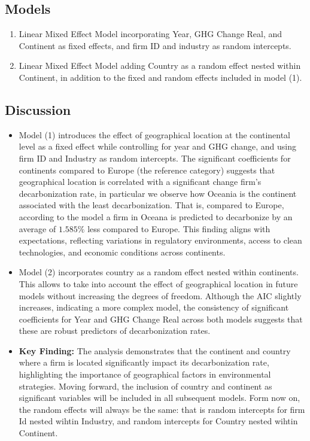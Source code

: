 \subsection{Models} 
\begin{enumerate}
    \item Linear Mixed Effect Model incorporating Year, GHG Change Real, and Continent as fixed effects, and firm ID and industry as random intercepts.
    \item Linear Mixed Effect Model adding Country as a random effect nested within Continent, in addition to the fixed and random effects included in model (1).
\end{enumerate}



\subsection{Discussion}
\begin{itemize}
    \item Model (1) introduces the effect of geographical location at the continental level as a fixed effect while controlling for year and GHG change, and using firm ID and Industry as random intercepts. The significant coefficients for continents compared to Europe (the reference category) suggests that geographical location is correlated with a significant change firm's decarbonization rate, in particular we observe how Oceania is the continent associated with the least decarbonization. That is, compared to Europe, according to the model a firm in Oceana is predicted to decarbonize by an average of $1.585 \%$ less compared to Europe. This finding aligns with expectations, reflecting variations in regulatory environments, access to clean technologies, and economic conditions across continents.
    \item Model (2) incorporates country as a random effect nested within continents. This allows to take into account the effect of geographical location in future models without increasing the degrees of freedom. Although the AIC slightly increases, indicating a more complex model, the consistency of significant coefficients for Year and GHG Change Real across both models suggests that these are robust predictors of decarbonization rates.
    \item \textbf{Key Finding:} The analysis demonstrates that the continent and country where a firm is located significantly impact its decarbonization rate, highlighting the importance of geographical factors in environmental strategies. Moving forward, the inclusion of country and continent as significant variables will be included in all subsequent models. Form now on, the random effects will always be the same: that is random intercepts for firm Id nested wihtin Industry, and random intercepts for Country nested wihtin Continent. 
\end{itemize}

